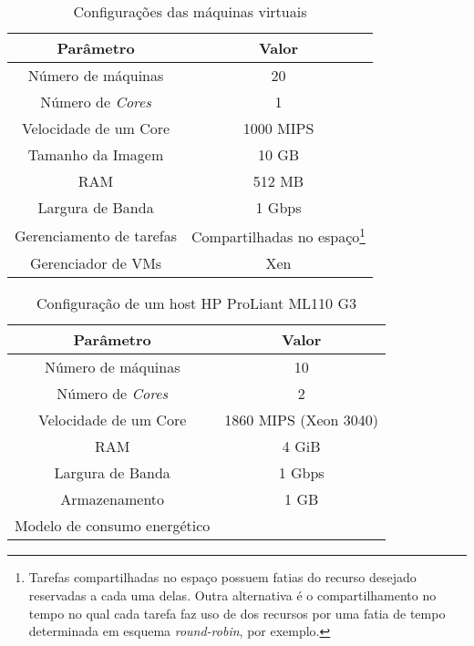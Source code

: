 \begin{savenotes}
\begin{table}
	\centering
    \begin{tabular}{|c|c|}
    \hline
    \textbf{Parâmetro}     & \textbf{Valor}     \\ \hline
    Número de máquinas     & 20        \\
    Número de \emph{Cores} & 1         \\
    Velocidade de um Core  & 1000 MIPS \\
    Tamanho da Imagem      & 10 GB  \\
    RAM                    & 512 MB    \\
    Largura de Banda       & 1 Gbps \\
    Gerenciamento de tarefas & Compartilhadas no espaço\footnote{Tarefas
    compartilhadas no espaço possuem fatias do recurso desejado
    reservadas a cada uma delas. Outra alternativa é o compartilhamento no tempo
    no qual cada tarefa faz uso de dos recursos por uma fatia de tempo
    determinada em esquema \emph{round-robin}, por exemplo.} \\
    Gerenciador de VMs     & Xen       \\     \hline
    \end{tabular}
    \caption {Configurações das máquinas virtuais}
    \label{tab:configuracao_vm}
\end{table}
\end{savenotes}

\begin{table}
	\centering
    \begin{tabular}{|c|c|}
    \hline
    \textbf{Parâmetro}            & \textbf{Valor}     \\ \hline
    Número de máquinas            & 10                            \\
    Número de \emph{Cores}        & 2                             \\
    Velocidade de um Core         & 1860 MIPS (Xeon 3040)         \\
    RAM                           & 4 GiB                         \\
    Largura de Banda              & 1 Gbps                        \\
    Armazenamento                 & 1 GB                          \\
    Modelo de consumo energético  & \cite{spec:proliant_ml110_g3} \\ \hline
    \end{tabular}
    \caption {Configuração de um host HP ProLiant ML110 G3}
    \label{tab:configuracao_hp_g3}
\end{table}



